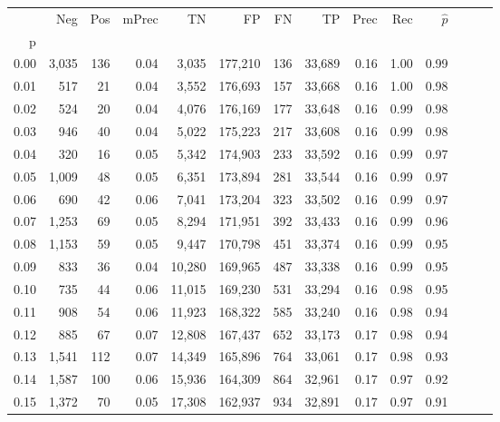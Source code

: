 \begin{tabular}{rrrrrrrrrrrrrr}
\toprule
{} &    Neg &  Pos & mPrec &       TN &       FP &      FN &      TP &  Prec &   Rec & $\hat{p}$ \\
p    &        &      &       &          &          &         &         &       &       &           \\
\midrule
0.00 &  3,035 &  136 &  0.04 &    3,035 &  177,210 &     136 &  33,689 &  0.16 &  1.00 &      0.99 \\
0.01 &    517 &   21 &  0.04 &    3,552 &  176,693 &     157 &  33,668 &  0.16 &  1.00 &      0.98 \\
0.02 &    524 &   20 &  0.04 &    4,076 &  176,169 &     177 &  33,648 &  0.16 &  0.99 &      0.98 \\
0.03 &    946 &   40 &  0.04 &    5,022 &  175,223 &     217 &  33,608 &  0.16 &  0.99 &      0.98 \\
0.04 &    320 &   16 &  0.05 &    5,342 &  174,903 &     233 &  33,592 &  0.16 &  0.99 &      0.97 \\
0.05 &  1,009 &   48 &  0.05 &    6,351 &  173,894 &     281 &  33,544 &  0.16 &  0.99 &      0.97 \\
0.06 &    690 &   42 &  0.06 &    7,041 &  173,204 &     323 &  33,502 &  0.16 &  0.99 &      0.97 \\
0.07 &  1,253 &   69 &  0.05 &    8,294 &  171,951 &     392 &  33,433 &  0.16 &  0.99 &      0.96 \\
0.08 &  1,153 &   59 &  0.05 &    9,447 &  170,798 &     451 &  33,374 &  0.16 &  0.99 &      0.95 \\
0.09 &    833 &   36 &  0.04 &   10,280 &  169,965 &     487 &  33,338 &  0.16 &  0.99 &      0.95 \\
0.10 &    735 &   44 &  0.06 &   11,015 &  169,230 &     531 &  33,294 &  0.16 &  0.98 &      0.95 \\
0.11 &    908 &   54 &  0.06 &   11,923 &  168,322 &     585 &  33,240 &  0.16 &  0.98 &      0.94 \\
0.12 &    885 &   67 &  0.07 &   12,808 &  167,437 &     652 &  33,173 &  0.17 &  0.98 &      0.94 \\
0.13 &  1,541 &  112 &  0.07 &   14,349 &  165,896 &     764 &  33,061 &  0.17 &  0.98 &      0.93 \\
0.14 &  1,587 &  100 &  0.06 &   15,936 &  164,309 &     864 &  32,961 &  0.17 &  0.97 &      0.92 \\
0.15 &  1,372 &   70 &  0.05 &   17,308 &  162,937 &     934 &  32,891 &  0.17 &  0.97 &      0.91 \\

\end{tabular}
